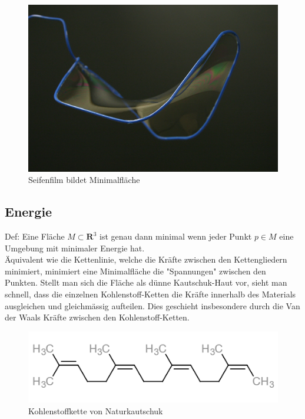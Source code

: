 \begin{refsection}
\begin{figure}[H]
  \centering
  \includegraphics[scale=0.6]{minimal/SoapFilm.jpg}
  \caption{Seifenfilm bildet Minimalfläche} 
\end{figure}

\subsection{Energie}
Def: Eine Fläche $M \subset \mathbf{R}^{3}$ ist genau dann minimal wenn jeder Punkt $p \in M$ eine Umgebung mit minimaler Energie hat.\\
Äquivalent wie die Kettenlinie, welche die Kräfte zwischen den Kettengliedern minimiert, minimiert eine Minimalfläche die "Spannungen" zwischen den Punkten. Stellt man sich die Fläche als dünne Kautschuk-Haut vor, sieht man schnell, dass die einzelnen Kohlenstoff-Ketten die Kräfte innerhalb des Materials ausgleichen und gleichmässig aufteilen. Dies geschieht insbesondere durch die Van der Waals Kräfte zwischen den Kohlenstoff-Ketten.

\begin{figure}[H]
  \centering
  \includegraphics[scale=1]{minimal/cis-Polyisopren.PNG}
  \caption{Kohlenstoffkette von Naturkautschuk} 
\end{figure}



\end{refsection}
